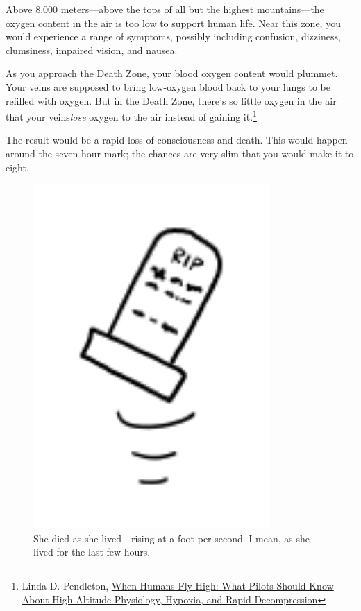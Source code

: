 {{Above 8,000 meters—above the tops of all but the highest mountains—the oxygen content in the air is too low to support human life. Near this zone, you would experience a range of symptoms, possibly including confusion, dizziness, clumsiness, impaired vision, and nausea.}

{As you approach the Death Zone, your blood oxygen content would plummet. Your veins are supposed to bring low-oxygen blood back to your lungs to be refilled with oxygen. But in the Death Zone, there's so little oxygen in the air that your veins\emph{lose} oxygen to the air instead of gaining it.{\footnote{Linda D. Pendleton, \href{http://www.avweb.com/news/aeromed/181893-1.html}{When Humans Fly High: What Pilots Should Know About High-Altitude Physiology, Hypoxia, and Rapid Decompression}} } }

{The result would be a rapid loss of consciousness and death. This would happen around the seven hour mark; the chances are very slim that you would make it to eight.}

\begin{figure}[!htbp]
\centering
\includegraphics[scale=0.5, max width=0.8\textwidth]{imgs/a/64/rising_grave.png}
\caption{She died as she lived—rising at a foot per second. I mean, as she lived for the last few hours.}
\end{figure}

}
